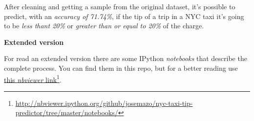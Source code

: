 \normalsize
After cleaning and getting a sample from the original dataset, it's possible to predict, with an \emph{accuracy of 71.74\%}, if the tip of a trip in a NYC taxi it's going to be \emph{less thant 20\%} or \emph{greater than or equal to 20\%} of the charge.

\Large
\textbf{Extended version}

\normalsize
For read an extended version there are some IPython \emph{notebooks} that describe the complete process. You can find them in this repo, but for a better reading use \href{http://nbviewer.ipython.org/github/josemazo/nyc-taxi-tip-predictor/tree/master/notebooks/}{this \emph{nbviewer} link}\footnote{\url{http://nbviewer.ipython.org/github/josemazo/nyc-taxi-tip-predictor/tree/master/notebooks/}}.
